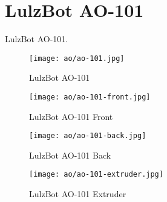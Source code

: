 %
%
%
%
%

\section{LulzBot AO-101}
LulzBot AO-101.

\begin{figure}[h!]
\texttt{[image: ao/ao-101.jpg]}
 \caption{LulzBot AO-101}
 \label{fig:ao-101}
\end{figure}

\begin{figure}[h!]
\texttt{[image: ao/ao-101-front.jpg]}
 \caption{LulzBot AO-101 Front}
 \label{fig:ao-101-front}
\end{figure}

\begin{figure}[h!]
\texttt{[image: ao/ao-101-back.jpg]}
 \caption{LulzBot AO-101 Back}
 \label{fig:ao-101-back}
\end{figure}




\begin{figure}[h!]
\texttt{[image: ao/ao-101-extruder.jpg]}
 \caption{LulzBot AO-101 Extruder}
 \label{fig:ao-101-extruder}
\end{figure}


